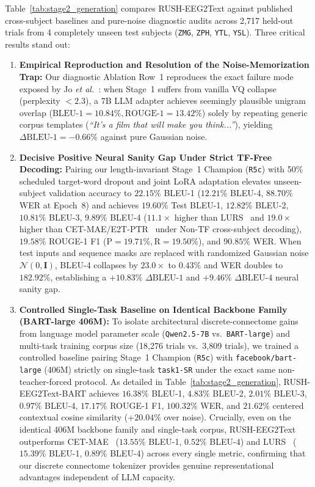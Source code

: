 \documentclass[journal]{IEEEtran}
\begin{document}
Table~\ref{tab:stage2_generation} compares RUSH-EEG2Text against published cross-subject baselines and pure-noise diagnostic audits across 2,717 held-out trials from 4 completely unseen test subjects (\texttt{ZMG}, \texttt{ZPH}, \texttt{YTL}, \texttt{YSL}). Three critical results stand out:
\begin{enumerate}
    \item \textbf{Empirical Reproduction and Resolution of the Noise-Memorization Trap:} Our diagnostic Ablation Row~1 reproduces the exact failure mode exposed by Jo \textit{et al.}~\cite{jo2024are}: when Stage~1 suffers from vanilla VQ collapse (perplexity $<2.3$), a 7B LLM adapter achieves seemingly plausible unigram overlap ($\text{BLEU-1}=10.84\%, \text{ROUGE-1}=13.42\%$) solely by repeating generic corpus templates (\textit{``It's a film that will make you think...''}), yielding $\Delta\text{BLEU-1} = -0.66\%$ against pure Gaussian noise.
    \item \textbf{Decisive Positive Neural Sanity Gap Under Strict TF-Free Decoding:} Pairing our length-invariant Stage~1 Champion (\texttt{R5c}) with 50\% scheduled target-word dropout and joint LoRA adaptation elevates unseen-subject validation accuracy to $22.15\%$ BLEU-1 ($12.21\%$ BLEU-4, $88.70\%$ WER at Epoch~8) and achieves $\mathbf{19.60\%}$ Test BLEU-1, $\mathbf{12.82\%}$ BLEU-2, $\mathbf{10.81\%}$ BLEU-3, $\mathbf{9.89\%}$ BLEU-4 ($11.1\times$ higher than LURS~\cite{park2026lurs} and $19.0\times$ higher than CET-MAE/E2T-PTR~\cite{wang2024cetmae} under Non-TF cross-subject decoding), $\mathbf{19.58\%}$ ROUGE-1 F1 ($\text{P}=19.71\%, \text{R}=19.50\%$), and $\mathbf{90.85\%}$ WER. When test inputs and sequence masks are replaced with randomized Gaussian noise $\mathcal{N}(0,\mathbf{I})$, BLEU-4 collapses by $23.0\times$ to $0.43\%$ and WER doubles to $182.92\%$, establishing a $+\mathbf{10.83\%}$ $\Delta\text{BLEU-1}$ and $+\mathbf{9.46\%}$ $\Delta\text{BLEU-4}$ neural sanity gap.
    \item \textbf{Controlled Single-Task Baseline on Identical Backbone Family (BART-large 406M):} To isolate architectural discrete-connectome gains from language model parameter scale (\texttt{Qwen2.5-7B} vs.\ \texttt{BART-large}) and multi-task training corpus size (18,276 trials vs.\ 3,809 trials), we trained a controlled baseline pairing Stage~1 Champion (\texttt{R5c}) with \texttt{facebook/bart-large} (406M) strictly on single-task \texttt{task1-SR} under the exact same non-teacher-forced protocol. As detailed in Table~\ref{tab:stage2_generation}, RUSH-EEG2Text-BART achieves $\mathbf{16.38\%}$ BLEU-1, $\mathbf{4.83\%}$ BLEU-2, $\mathbf{2.01\%}$ BLEU-3, $\mathbf{0.97\%}$ BLEU-4, $\mathbf{17.17\%}$ ROUGE-1 F1, $\mathbf{100.32\%}$ WER, and $\mathbf{21.62\%}$ centered contextual cosine similarity ($+20.04\%$ over noise). Crucially, even on the identical 406M backbone family and single-task corpus, RUSH-EEG2Text outperforms CET-MAE~\cite{wang2024cetmae} ($13.55\%$ BLEU-1, $0.52\%$ BLEU-4) and LURS~\cite{park2026lurs} ($15.39\%$ BLEU-1, $0.89\%$ BLEU-4) across every single metric, confirming that our discrete connectome tokenizer provides genuine representational advantages independent of LLM capacity.

\end{enumerate}
\end{document}

